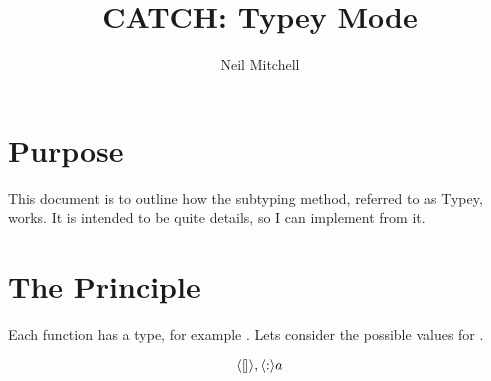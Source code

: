 \documentclass{article}
\title{CATCH: Typey Mode}
\author{Neil Mitchell}
\begin{document}
\maketitle

\section{Purpose}

This document is to outline how the subtyping method, referred to as
Typey, works. It is intended to be quite details, so I can implement
from it.

\section{The Principle}

Each function has a type, for example . Lets
consider the possible values for \T{[a]}.

\[ \langle \talloblong \rangle ,
   \langle : \rangle a
 \]
\end{document}

